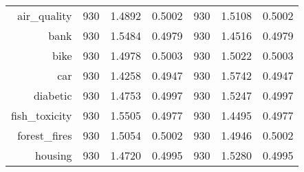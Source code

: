 \begin{table}[htbp]
{\begin{tabular}{rcccccc}
			air\_quality                       & 930                                        & \cellcolor[rgb]{ .776,  .937,  .808}\textcolor[rgb]{ 0,  .38,  0}{1.4892}          & 0.5002          & 930                               & 1.5108                                                                    & 0.5002          \\
			bank                               & 930                                        & 1.5484                                                                             & 0.4979          & 930                               & \cellcolor[rgb]{ .776,  .937,  .808}\textcolor[rgb]{ 0,  .38,  0}{1.4516} & 0.4979          \\
			bike                               & 930                                        & \cellcolor[rgb]{ .776,  .937,  .808}\textcolor[rgb]{ 0,  .38,  0}{1.4978}          & 0.5003          & 930                               & 1.5022                                                                    & 0.5003          \\
			car                                & 930                                        & \cellcolor[rgb]{ .776,  .937,  .808}\textcolor[rgb]{ 0,  .38,  0}{1.4258}          & 0.4947          & 930                               & 1.5742                                                                    & 0.4947          \\
			diabetic                           & 930                                        & \cellcolor[rgb]{ .776,  .937,  .808}\textcolor[rgb]{ 0,  .38,  0}{1.4753}          & 0.4997          & 930                               & 1.5247                                                                    & 0.4997          \\
			fish\_toxicity                     & 930                                        & 1.5505                                                                             & 0.4977          & 930                               & \cellcolor[rgb]{ .776,  .937,  .808}\textcolor[rgb]{ 0,  .38,  0}{1.4495} & 0.4977          \\
			forest\_fires                      & 930                                        & 1.5054                                                                             & 0.5002          & 930                               & \cellcolor[rgb]{ .776,  .937,  .808}\textcolor[rgb]{ 0,  .38,  0}{1.4946} & 0.5002          \\
			housing                            & 930                                        & \cellcolor[rgb]{ .776,  .937,  .808}\textcolor[rgb]{ 0,  .38,  0}{1.4720}          & 0.4995          & 930                               & 1.5280                                                                    & 0.4995          \\

\end{tabular}}
\end{table}
